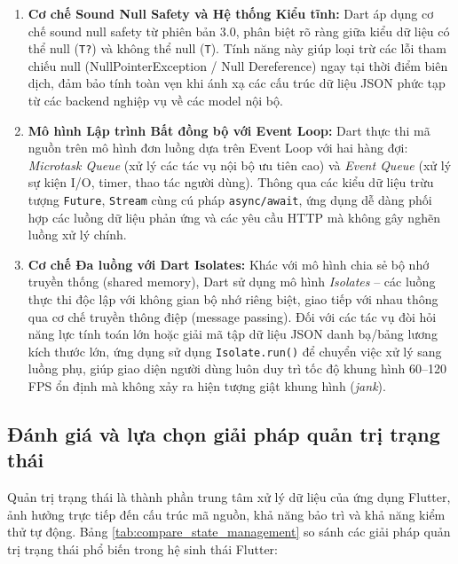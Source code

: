 \begin{enumerate}[leftmargin=*]
    \item \textbf{Cơ chế Sound Null Safety và Hệ thống Kiểu tĩnh:} Dart áp dụng cơ chế sound null safety từ phiên bản 3.0, phân biệt rõ ràng giữa kiểu dữ liệu có thể null (\texttt{T?}) và không thể null (\texttt{T}). Tính năng này giúp loại trừ các lỗi tham chiếu null (NullPointerException / Null Dereference) ngay tại thời điểm biên dịch, đảm bảo tính toàn vẹn khi ánh xạ các cấu trúc dữ liệu JSON phức tạp từ các backend nghiệp vụ về các model nội bộ.
    \item \textbf{Mô hình Lập trình Bất đồng bộ với Event Loop:} Dart thực thi mã nguồn trên mô hình đơn luồng dựa trên Event Loop với hai hàng đợi: \textit{Microtask Queue} (xử lý các tác vụ nội bộ ưu tiên cao) và \textit{Event Queue} (xử lý sự kiện I/O, timer, thao tác người dùng). Thông qua các kiểu dữ liệu trừu tượng \texttt{Future}, \texttt{Stream} cùng cú pháp \texttt{async/await}, ứng dụng dễ dàng phối hợp các luồng dữ liệu phản ứng và các yêu cầu HTTP mà không gây nghẽn luồng xử lý chính.
    \item \textbf{Cơ chế Đa luồng với Dart Isolates:} Khác với mô hình chia sẻ bộ nhớ truyền thống (shared memory), Dart sử dụng mô hình \textit{Isolates} -- các luồng thực thi độc lập với không gian bộ nhớ riêng biệt, giao tiếp với nhau thông qua cơ chế truyền thông điệp (message passing). Đối với các tác vụ đòi hỏi năng lực tính toán lớn hoặc giải mã tập dữ liệu JSON danh bạ/bảng lương kích thước lớn, ứng dụng sử dụng \texttt{Isolate.run()} để chuyển việc xử lý sang luồng phụ, giúp giao diện người dùng luôn duy trì tốc độ khung hình 60--120 FPS ổn định mà không xảy ra hiện tượng giật khung hình (\textit{jank}).
\end{enumerate}

\subsection{Đánh giá và lựa chọn giải pháp quản trị trạng thái}
\label{subsec:compare_state_management}

Quản trị trạng thái là thành phần trung tâm xử lý dữ liệu của ứng dụng Flutter, ảnh hưởng trực tiếp đến cấu trúc mã nguồn, khả năng bảo trì và khả năng kiểm thử tự động. Bảng \ref{tab:compare_state_management} so sánh các giải pháp quản trị trạng thái phổ biến trong hệ sinh thái Flutter:

